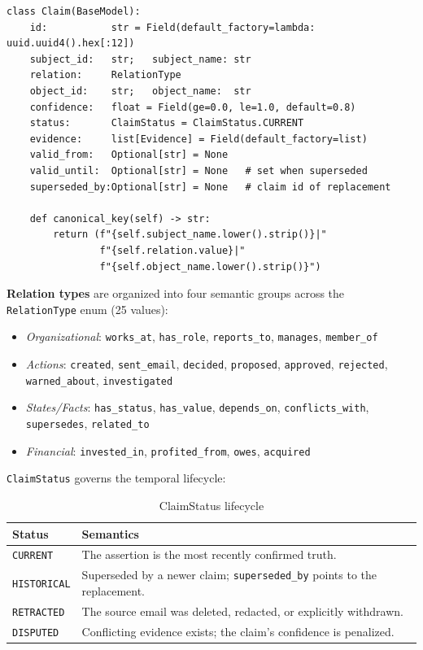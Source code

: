 \documentclass[12pt,a4paper]{article}
\begin{document}
\begin{lstlisting}[caption=Claim model (schema.py)]
class Claim(BaseModel):
    id:           str = Field(default_factory=lambda: uuid.uuid4().hex[:12])
    subject_id:   str;   subject_name: str
    relation:     RelationType
    object_id:    str;   object_name:  str
    confidence:   float = Field(ge=0.0, le=1.0, default=0.8)
    status:       ClaimStatus = ClaimStatus.CURRENT
    evidence:     list[Evidence] = Field(default_factory=list)
    valid_from:   Optional[str] = None
    valid_until:  Optional[str] = None   # set when superseded
    superseded_by:Optional[str] = None   # claim id of replacement

    def canonical_key(self) -> str:
        return (f"{self.subject_name.lower().strip()}|"
                f"{self.relation.value}|"
                f"{self.object_name.lower().strip()}")
\end{lstlisting}

\textbf{Relation types} are organized into four semantic groups across the \texttt{RelationType} enum (25 values):

\begin{itemize}
    \item \textit{Organizational}: \texttt{works\_at}, \texttt{has\_role}, \texttt{reports\_to}, \texttt{manages}, \texttt{member\_of}
    \item \textit{Actions}: \texttt{created}, \texttt{sent\_email}, \texttt{decided}, \texttt{proposed}, \texttt{approved}, \texttt{rejected}, \texttt{warned\_about}, \texttt{investigated}
    \item \textit{States/Facts}: \texttt{has\_status}, \texttt{has\_value}, \texttt{depends\_on}, \texttt{conflicts\_with}, \texttt{supersedes}, \texttt{related\_to}
    \item \textit{Financial}: \texttt{invested\_in}, \texttt{profited\_from}, \texttt{owes}, \texttt{acquired}
\end{itemize}

\texttt{ClaimStatus} governs the temporal lifecycle:

\begin{table}[H]
\centering
\begin{tabular}{@{}ll@{}}
\toprule
\textbf{Status} & \textbf{Semantics} \\ \midrule
\texttt{CURRENT}    & The assertion is the most recently confirmed truth. \\
\texttt{HISTORICAL} & Superseded by a newer claim; \texttt{superseded\_by} points to the replacement. \\
\texttt{RETRACTED}  & The source email was deleted, redacted, or explicitly withdrawn. \\
\texttt{DISPUTED}   & Conflicting evidence exists; the claim's confidence is penalized. \\
\bottomrule
\end{tabular}
\caption{ClaimStatus lifecycle}
\end{table}
\end{document}

